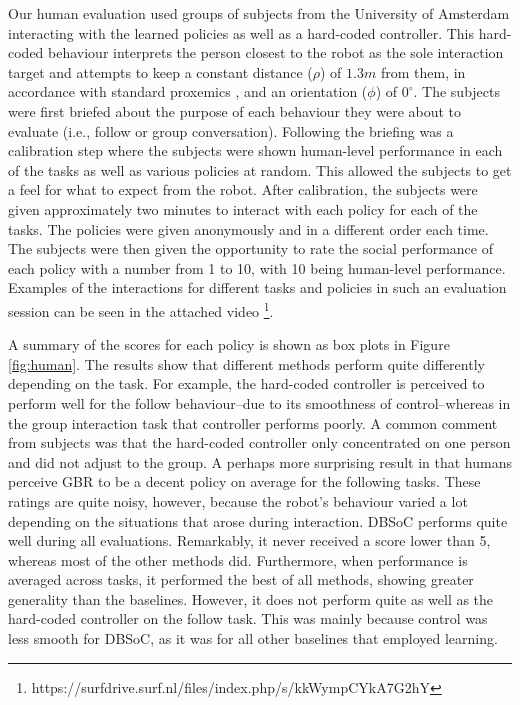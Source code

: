 \documentclass[letterpaper, 10 pt, conference]{ieeeconf}
\begin{document}
Our human evaluation used groups of subjects from the University of Amsterdam interacting with the learned policies as well as a hard-coded controller. This hard-coded behaviour interprets the person closest to the robot as the sole interaction target and attempts to keep a constant distance ($\rho$) of $1.3m$ from them, in accordance with standard proxemics \cite{hall1966hidden}, and an orientation ($\phi$) of $0^\circ$. The subjects were first briefed about the purpose of each behaviour they were about to evaluate (i.e., follow or group conversation). Following the briefing was a calibration step where the subjects were shown human-level performance in each of the tasks as well as various policies at random. This allowed the subjects to get a feel for what to expect from the robot. After calibration, the subjects were given approximately two minutes to interact with each policy for each of the tasks. The policies were given anonymously and in a different order each time. The subjects were then given the opportunity to rate the social performance of each policy with a number from 1 to 10, with 10 being human-level performance. Examples of the interactions for different tasks and policies in such an evaluation session can be seen in the attached video \footnote{https://surfdrive.surf.nl/files/index.php/s/kkWympCYkA7G2hY}.

A summary of the scores for each policy is shown as box plots in Figure \ref{fig:human}. The results show that different methods perform quite differently depending on the task. For example, the hard-coded controller is perceived to perform  well for the follow behaviour--due to its smoothness of control--whereas in the group interaction task that controller performs poorly. A common comment from subjects was that the hard-coded controller only concentrated on one person and did not adjust to the group. A perhaps more surprising result in that humans perceive GBR to be a decent policy on average for the following tasks. These ratings are quite noisy, however, because the robot's behaviour varied a lot depending on the situations that arose during interaction. DBSoC performs quite well during all evaluations. Remarkably, it never received a score lower than 5, whereas most of the other methods did.  Furthermore, when performance is averaged across tasks, it performed the best of all methods, showing greater generality than the baselines.  However, it does not perform quite as well as the hard-coded controller on the follow task. This was mainly because control was less smooth for DBSoC, as it was for all other baselines that employed learning.
\end{document}
